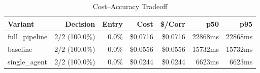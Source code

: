 \begin{table}[htbp]
\centering
\caption{Cost--Accuracy Tradeoff}
\label{tab:cost-accuracy}
\begin{tabular}{l r r rr rr}
\toprule
Variant & Decision & Entry & Cost & \$/Corr & p50 & p95 \\
\midrule
  full\_pipeline & 2/2 (100.0\%) & 0.0\% & \$0.0716 & \$0.0716 & 22868ms & 22868ms \\
  baseline & 2/2 (100.0\%) & 0.0\% & \$0.0556 & \$0.0556 & 15732ms & 15732ms \\
  single\_agent & 2/2 (100.0\%) & 0.0\% & \$0.0244 & \$0.0244 & 6623ms & 6623ms \\
\bottomrule
\end{tabular}
\end{table}
